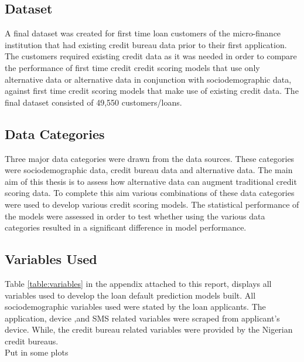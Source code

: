 \subsection{Dataset}

A final dataset was created for first time loan customers of the micro-finance institution that had existing credit bureau data prior to their first application. The customers required existing credit data as it was needed in order to compare the performance of first time credit credit scoring models that use only alternative data or alternative data in conjunction with sociodemographic data, against first time credit scoring models that make use of existing credit data. The final dataset consisted of 49,550 customers/loans. 

\subsection{Data Categories}

Three major data categories were drawn from the data sources. These categories were sociodemographic data, credit bureau data and alternative data. The main aim of this thesis is to assess how alternative data can augment traditional credit scoring data. To complete this aim various combinations of these data categories were used to develop various credit scoring models. The statistical performance of the models were assessed in order to test whether using the various data categories resulted in a significant difference in model performance. 

\subsection{Variables Used}

Table \ref{table:variables} in the appendix attached to this report, displays all variables used to develop the loan default prediction models built. All sociodemographic variables used were stated by the loan applicants. The application, device ,and SMS related variables were scraped from applicant's device. While, the credit bureau related variables were provided by the Nigerian credit bureaus.  \\

Put in some plots



